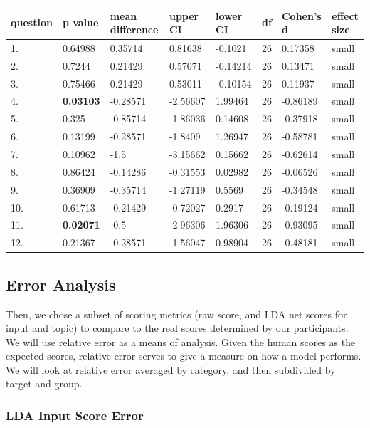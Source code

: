 \documentclass[11pt, twoside, reqno]{book}
\begin{document}
\begin{tabular}{|l|l|l|l|l|l|l|l|}
\hline
    question & p value & mean difference & upper CI & lower CI & df & Cohen's d & effect size  \\ \hline
    1. & 0.64988 & 0.35714 & 0.81638 & -0.1021 & 26 & 0.17358 & small \\ \hline
    2. & 0.7244 & 0.21429 & 0.57071 & -0.14214 & 26 & 0.13471 & small  \\ \hline
    3. & 0.75466 & 0.21429 & 0.53011 & -0.10154 & 26 & 0.11937 & small  \\ \hline
    4. & \textbf{0.03103} & -0.28571 & -2.56607 & 1.99464 & 26 & -0.86189 & small \\ \hline
    5. & 0.325 & -0.85714 & -1.86036 & 0.14608 & 26 & -0.37918 & small  \\ \hline
    6. & 0.13199 & -0.28571 & -1.8409 & 1.26947 & 26 & -0.58781 & small \\ \hline
    7. & 0.10962 & -1.5 & -3.15662 & 0.15662 & 26 & -0.62614 & small \\ \hline
    8. & 0.86424 & -0.14286 & -0.31553 & 0.02982 & 26 & -0.06526 & small \\ \hline
    9. & 0.36909 & -0.35714 & -1.27119 & 0.5569 & 26 & -0.34548 & small \\ \hline
    10. & 0.61713 & -0.21429 & -0.72027 & 0.2917 & 26 & -0.19124 & small  \\ \hline
    11. & \textbf{0.02071} & -0.5 & -2.96306 & 1.96306 & 26 & -0.93095 & small \\ \hline
    12. & 0.21367 & -0.28571 & -1.56047 & 0.98904 & 26 & -0.48181 & small \\ \hline
\end{tabular}
\vspace{16pt}

\subsection{Error Analysis}

Then, we chose a subset of scoring metrics (raw score, and LDA net scores for input and topic) to compare to the real scores determined by our participants. We will use relative error as a means of analysis. Given the human scores as the expected scores, relative error serves to give a measure on how a model performs. We will look at relative error averaged by category, and then subdivided by target and group.

\subsubsection{\textbf{LDA Input Score Error}}
\end{document}
